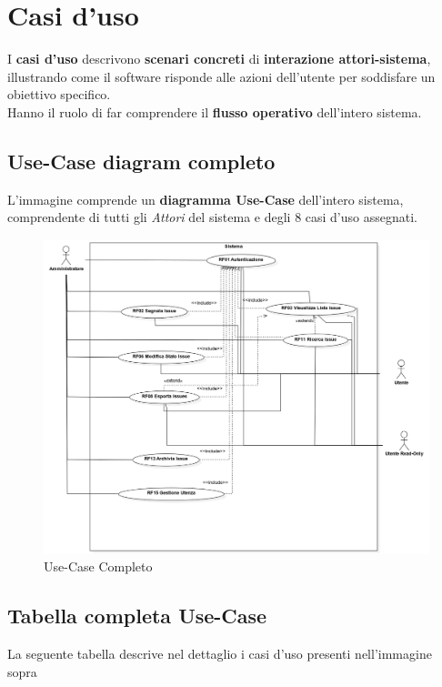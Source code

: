 \chapter{Casi d'uso}
I \textbf{casi d'uso} descrivono \textbf{scenari concreti} di \textbf{interazione attori-sistema}, illustrando come il software risponde alle azioni dell'utente per soddisfare un obiettivo specifico.\\
Hanno il ruolo di far comprendere il \textbf{flusso operativo} dell'intero sistema.

\section{Use-Case diagram completo}
L'immagine comprende un \textbf{diagramma Use-Case} dell'intero sistema, comprendente di tutti gli \textit{Attori} del sistema e degli 8 casi d'uso assegnati.
\begin{figure}[h]
	\centering
	\includegraphics[width=0.7\linewidth]{./Assets/Chapters/use_case.png}
	\caption{Use-Case Completo}
\end{figure}
	
	
\section{Tabella completa Use-Case}
La seguente tabella descrive nel dettaglio i casi d'uso presenti nell'immagine sopra

